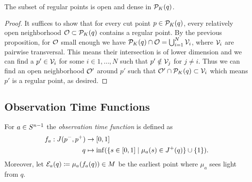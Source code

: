 \begin{corollary}The subset of regular points is open and dense in $\mathcal{P}_K(q)$.
\end{corollary}
\begin{proof}
It suffices to show that for every cut point $p\in \mathcal{P}_K(q)$, every relatively open neighborhood $\mathcal{O}\subset\mathcal{P}_K(q)$ contains a regular point. By the previous proposition, for $\mathcal{O}$ small enough we have $\mathcal{P}_K(q)\cap \mathcal{O} = \bigcup_{i=1}^N\mathcal{V}_i$, where $\mathcal{V}_i$ are pairwise transversal. This means their intersection is of lower dimension and we can find a $p'\in \mathcal{V}_i$ for some $i\in 1,\dots,N$ such that $p'\notin \mathcal{V}_j$ for $j\neq i$. Thus we can find an open neighborhood $\mathcal{O}'$ around $p'$ such that $\mathcal{O}'\cap \mathcal{P}_K(q)\subset \mathcal{V}_i$ which means $p'$ is a regular point, as desired.
\end{proof}

\subsection{Observation Time Functions}
\begin{definition}\label{def:observationtime}
For $a\in S^{n-1}$ the \emph{observation time function} 
is defined as 
\begin{align*}
    f_a:J(p^-,p^+)&\to [0,1]\\
    q&\mapsto\inf(\{s\in [0,1] \mid \mu_a(s)\in J^+(q)\}\cup \{1\}).
\end{align*}
Moreover, let $\mathcal{E}_a(q)\coloneqq\mu_a(f_a(q))\in M$ be the earliest point where $\mu_a$ sees light from $q$.
\end{definition}

